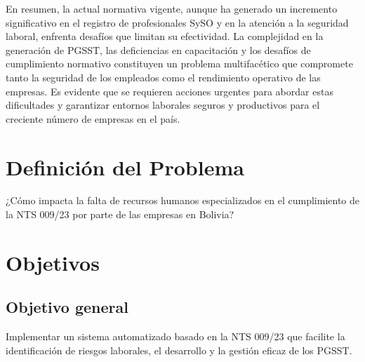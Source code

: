 En resumen, la actual normativa vigente, aunque ha generado un incremento significativo en el registro de profesionales SySO y en la atención a la seguridad laboral, enfrenta desafíos que limitan su efectividad. La complejidad en la generación de PGSST, las deficiencias en capacitación y los desafíos de cumplimiento normativo constituyen un problema multifacético que compromete tanto la seguridad de los empleados como el rendimiento operativo de las empresas. Es evidente que se requieren acciones urgentes para abordar estas dificultades y garantizar entornos laborales seguros y productivos para el creciente número de empresas en el país.

\section{Definición del Problema} 
¿Cómo impacta la falta de recursos humanos especializados en el cumplimiento de la NTS 009/23 por parte de las empresas en Bolivia?

\section{Objetivos}
\subsection{Objetivo general}
Implementar un sistema automatizado basado en la NTS 009/23 que facilite la identificación de riesgos laborales, el desarrollo y la gestión eficaz de los PGSST.

